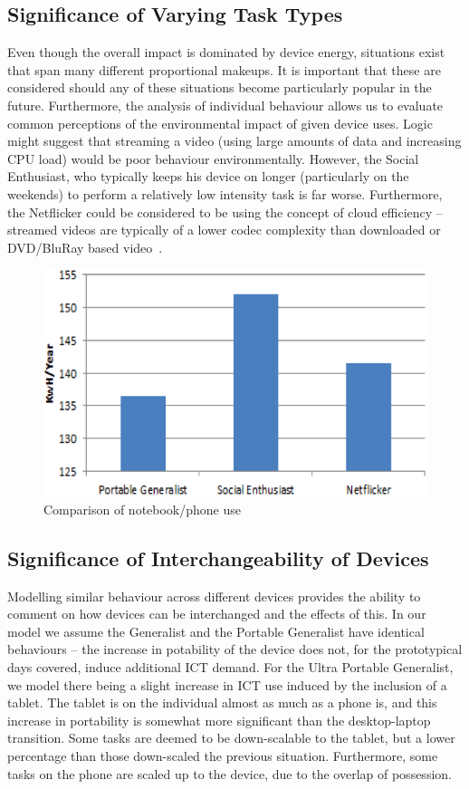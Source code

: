 \documentclass[conference]{IEEEtran}
\begin{document}
\subsection{Significance of Varying Task Types}

Even though the overall impact is dominated by device energy,
situations exist that span many different proportional makeups. It is
important that these are considered should any of these situations
become particularly popular in the future. Furthermore, the analysis
of individual behaviour allows us to evaluate common perceptions of
the environmental impact of given device uses. Logic might suggest
that streaming a video (using large amounts of data and increasing CPU
load) would be poor behaviour environmentally. However, the Social
Enthusiast, who typically keeps his device on longer (particularly on
the weekends) to perform a relatively low intensity task is far
worse. Furthermore, the Netflicker could be considered to be using the
concept of cloud efficiency -- streamed videos are typically of a
lower codec complexity than downloaded or DVD/BluRay based
video~\cite{schien-et-al:2013}.

\begin{figure}
\centering
\includegraphics[width=0.8\columnwidth]{images/comparison_users_devices.png}
\caption{Comparison of notebook/phone use}
\label{fig:comparison_users_devices.png} 
\end{figure}

\subsection{Significance of Interchangeability of Devices}

Modelling similar behaviour across different devices provides the
ability to comment on how devices can be interchanged and the effects
of this. In our model we assume the Generalist and the Portable
Generalist have identical behaviours -- the increase in potability of
the device does not, for the prototypical days covered, induce
additional ICT demand. For the Ultra Portable Generalist, we model
there being a slight increase in ICT use induced by the inclusion of a
tablet. The tablet is on the individual almost as much as a phone is,
and this increase in portability is somewhat more significant than the
desktop-laptop transition. Some tasks are deemed to be down-scalable
to the tablet, but a lower percentage than those down-scaled the
previous situation. Furthermore, some tasks on the phone are scaled up
to the device, due to the overlap of possession.
\end{document}
